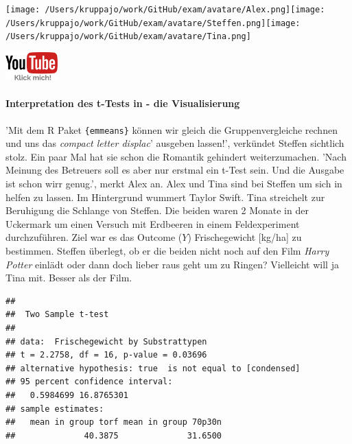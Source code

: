 \documentclass[a4paper, 9pt]{scrartcl}\usepackage[]{graphicx}\usepackage[]{xcolor}
\makeatletter
\newenvironment{kframe}{%
 \def\at@end@of@kframe{}%
 \ifinner\ifhmode%
  \def\at@end@of@kframe{\end{minipage}}%
  \begin{minipage}{\columnwidth}%
 \fi\fi%
 \def\FrameCommand##1{\hskip\@totalleftmargin \hskip-\fboxsep
 \colorbox{shadecolor}{##1}\hskip-\fboxsep
     \hskip-\linewidth \hskip-\@totalleftmargin \hskip\columnwidth}%
 \MakeFramed {\advance\hsize-\width
   \@totalleftmargin\z@ \linewidth\hsize
   \@setminipage}}%
 {\par\unskip\endMakeFramed%
 \at@end@of@kframe}
\newenvironment{knitrout}{}{} %
\makeatother
\begin{document}
 
\begin{minipage}[t]{0.5\textwidth}
\texttt{[image: /Users/kruppajo/work/GitHub/exam/avatare/Alex.png]}\hspace{-4mm}\texttt{[image: /Users/kruppajo/work/GitHub/exam/avatare/Steffen.png]}\hspace{-4mm}\texttt{[image: /Users/kruppajo/work/GitHub/exam/avatare/Tina.png]}
\end{minipage}
\begin{minipage}[t]{0.5\textwidth}
\hfill
\href{https://youtu.be/w62HJlbN28U}{\includegraphics[width = 2cm]{img/youtube}}
\end{minipage}



\paragraph{Interpretation des t-Tests in \Rlogo - die Visualisierung}

'Mit dem R Paket \texttt{\{emmeans\}} können wir gleich die Gruppenvergleiche rechnen und uns das \textit{compact letter displac}' ausgeben lassen!', verkündet Steffen sichtlich stolz. Ein paar Mal hat sie schon die Romantik gehindert weiterzumachen. 'Nach Meinung des Betreuers soll es aber nur erstmal ein t-Test sein. Und die Ausgabe ist schon wirr genug.', merkt Alex an. Alex und Tina sind bei Steffen um sich in \Rlogo helfen zu lassen. Im Hintergrund wummert Taylor Swift. Tina streichelt zur Beruhigung die Schlange von Steffen. Die beiden waren 2 Monate in der Uckermark um einen Versuch mit Erdbeeren in einem Feldexperiment durchzuführen. Ziel war es das Outcome ($Y$) Frischegewicht [kg/ha] zu bestimmen. Steffen überlegt, ob er die beiden nicht noch auf den Film \textit{Harry Potter} einlädt oder dann doch lieber raus geht um zu Ringen? Vielleicht will ja Tina mit. Besser als der Film.

\begin{knitrout}
\color{fgcolor}\begin{kframe}
\begin{verbatim}
## 
## 	Two Sample t-test
## 
## data:  Frischegewicht by Substrattypen
## t = 2.2758, df = 16, p-value = 0.03696
## alternative hypothesis: true  is not equal to [condensed]
## 95 percent confidence interval:
##   0.5984699 16.8765301
## sample estimates:
##   mean in group torf mean in group 70p30n 
##              40.3875              31.6500
\end{verbatim}
\end{kframe}
\end{knitrout}
\end{document}
